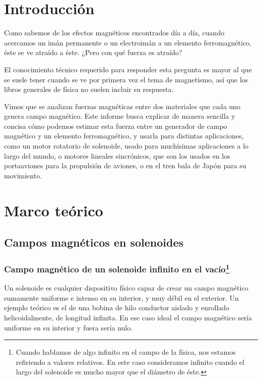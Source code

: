 \documentclass[a4paper,12pt]{article}
\begin{document}
    

\section*{Introducción}

    Como sabemos de los efectos magnéticos encontrados día a día, cuando acercamos un imán permanente o un electroimán a un elemento ferromagnético, éste se ve atraído a éste. ¿Pero con qué fuerza es atraído?

    El conocimiento técnico requerido para responder esta pregunta es mayor al que se suele tener cuando se ve por primera vez el tema de magnetismo, así que los libros generales de física no suelen incluir su respuesta. 
    
    Vimos que se analizan fuerzas magnéticas entre dos materiales que cada uno genera campo magnético. Este informe busca explicar de manera sencilla y concisa cómo podemos estimar esta fuerza entre un generador de campo magnético y un elemento ferromagnético, y usarla para distintas aplicaciones, como un motor rotatorio de solenoide, usado para muchísimas aplicaciones a lo largo del mundo, o motores lineales sincrónicos, que son los usados en los portaaviones para la propulsión de aviones, o en el tren bala de Japón para su movimiento.

\section*{Marco teórico}

    \subsection*{Campos magnéticos en solenoides}

    \subsubsection*{Campo magnético de un solenoide infinito en el vacío\footnote{Cuando hablamos de algo infinito en el campo de la física, nos estamos refiriendo a valores relativos. En este caso consideramos infinito cuando el largo del solenoide es mucho mayor que el diámetro de éste.}}

        Un solenoide es cualquier dispositivo físico capaz de crear un campo magnético sumamente uniforme e intenso en su interior, y muy débil en el exterior. Un ejemplo teórico es el de una bobina de hilo conductor aislado y enrollado helicoidalmente, de longitud infinita. En ese caso ideal el campo magnético sería uniforme en su interior y fuera sería nulo.
\end{document}
